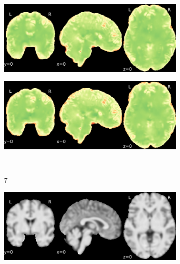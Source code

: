 \documentclass{article}
\begin{document}
\begin{appendices}
\begin{landscape}
\begin{figure}
\begin{subfigure}[t]{0.2\paperheight}
            \end{subfigure}
            \begin{subfigure}[t]{0.2\paperheight}
                \centering
                \includegraphics[width=\textwidth]{figures/sig/5mm/rs_ds001748_sub-adult16_sig.pdf}
            \end{subfigure}
            \begin{subfigure}[t]{0.2\paperheight}
                \centering
                \includegraphics[width=\textwidth]{figures/sig/5mm/rr.rs_ds001748_sub-adult16_sig.pdf}
            \end{subfigure} \\
            \begin{subfigure}[b][][c]{0.01\paperwidth} 7 \vspace*{15pt} \end{subfigure}
            \begin{subfigure}[t]{0.2\paperheight}
                \centering
                \includegraphics[width=\textwidth]{figures/sig/5mm/ieee_ds002338_sub-xp201.pdf}

\end{subfigure}
\end{figure}
\end{landscape}
\end{appendices}
\end{document}
